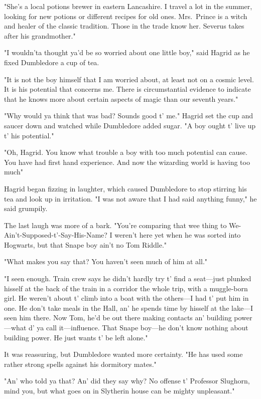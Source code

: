 "She's a local potions brewer in eastern Lancashire. I travel a lot in the summer, looking for new potions or different recipes for old ones. Mrs.~Prince is a witch and healer of the classic tradition. Those in the trade know her. Severus takes after his grandmother."

"I wouldn'ta thought ya'd be so worried about one little boy," said Hagrid as he fixed Dumbledore a cup of tea.

"It is not the boy himself that I am worried about, at least not on a cosmic level. It is his potential that concerns me. There is circumstantial evidence to indicate that he knows more about certain aspects of magic than our seventh years."

"Why would ya think that was bad? Sounds good t' me." Hagrid set the cup and saucer down and watched while Dumbledore added sugar. "A boy ought t' live up t' his potential."

"Oh, Hagrid. You know what trouble a boy with too much potential can cause. You have had first hand experience. And now the wizarding world is having too much{\el}"

Hagrid began fizzing in laughter, which caused Dumbledore to stop stirring his tea and look up in irritation. "I was not aware that I had said anything funny," he said grumpily.

The last laugh was more of a bark. "You're comparing that wee thing to We-Ain't-Supposed-t'-Say-His-Name? I weren't here yet when he was sorted into Hogwarts, but that Snape boy ain't no Tom Riddle."

"What makes you say that? You haven't seen much of him at all."

"I seen enough. Train crew says he didn't hardly try t' find a seat—just plunked hisself at the back of the train in a corridor the whole trip, with a muggle-born girl. He weren't about t' climb into a boat with the others—I had t' put him in one. He don't take meals in the Hall, an' he spends time by hisself at the lake—I seen him there. Now Tom, he'd be out there making contacts an' building power—what d' ya call it—influence. That Snape boy—he don't know nothing about building power. He just wants t' be left alone."

It was reassuring, but Dumbledore wanted more certainty. "He has used some rather strong spells against his dormitory mates."

"An' who told ya that? An' did they say why? No offense t' Professor Slughorn, mind you, but what goes on in Slytherin house can be mighty unpleasant."

